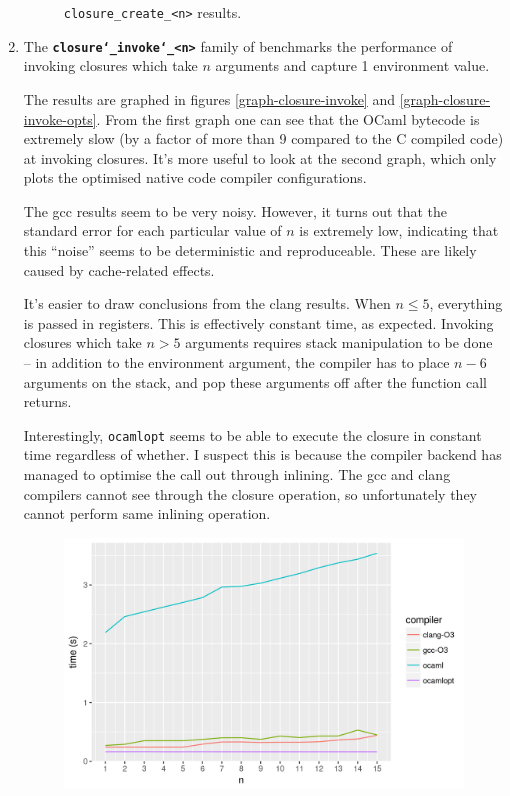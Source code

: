\documentclass[12pt,a4paper,twoside,openright]{report}
\begin{document}
\begin{enumerate}
\begin{figure}[h]
  \caption{\lstinline!closure_create_<n>! results.}\label{graph-closure-create}
\end{figure}


  \item
    The \textbf{\texttt{closure\char`_invoke\char`_<n>}} family of benchmarks the performance of
    invoking closures which take $n$ arguments and capture 1 environment value.

    The results are graphed in figures \ref{graph-closure-invoke} and
    \ref{graph-closure-invoke-opts}. From the first graph one can see that the
    OCaml bytecode is extremely slow (by a factor of more than 9 compared to
    the C compiled code) at invoking closures. It's more useful to look at the
    second graph, which only plots the optimised native code compiler configurations.

    The gcc results seem to be very noisy. However, it turns out that the
    standard error for each particular value of $n$ is extremely low,
    indicating that this ``noise'' seems to be deterministic and
    reproduceable. These are likely caused by cache-related effects.

    It's easier to draw conclusions from the clang results. When $n \le 5$,
    everything is passed in registers. This is effectively constant time, as expected.
    Invoking closures which take $n > 5$ arguments requires stack manipulation to be done --
    in addition to the environment argument, the compiler has to place $n - 6$
    arguments on the stack, and pop these arguments off after the function call
    returns.

    Interestingly, \lstinline!ocamlopt! seems to be able to execute the closure
    in constant time regardless of whether. I suspect this is because the
    compiler backend has managed to optimise the call out through inlining.
    The gcc and clang compilers cannot see through the closure operation, so
    unfortunately they cannot perform same inlining operation.

    \begin{figure}[h]
\centering
  \includegraphics[width=16cm]{resultclosure_invoke_summary_all-b477d4580}


\end{figure}
\end{enumerate}
\end{document}
